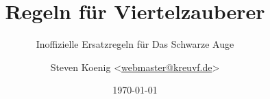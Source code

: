 \title{Regeln für Viertelzauberer}
\subtitle{Inoffizielle Ersatzregeln für Das Schwarze Auge}
\author{Steven Koenig <\href{mailto:webmaster@kreuvf.de}{webmaster@kreuvf.de}>}
\date{\today}
\maketitle
